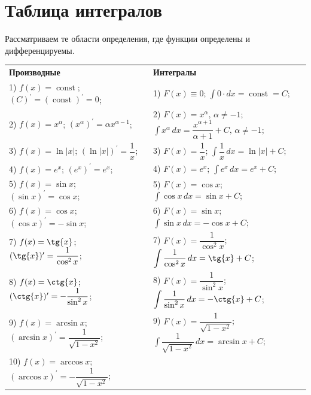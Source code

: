 \documentclass[12pt]{article}
\theoremstyle{definition}
\DeclareMathOperator{\const}{\text{const}}
\DeclareMathOperator{\dint}{\displaystyle\int}
\begin{document}
\newpage
\section*{Таблица интегралов}
Рассматриваем те области определения, где функции определены и дифференцируемы. 

\begin{tabular}{|p{}|p{}|}	
	\hline
	\rule{0pt}{3ex}\textbf{Производные} &\textbf{Интегралы}\\[0.5ex] \hhline{|=|=|}
	\rule{0pt}{4.2ex}1) $f(x) = \const$; $(C)^\prime = (\const)^\prime = 0$;& 
	\rule{0pt}{4.2ex}1) $F(x) \equiv 0$; $\dint 0{\cdot}dx = \const = C$;
	\\[2.4ex]\hline
	\rule{0pt}{4.2ex}2) $f(x) = x^\alpha$; $(x^\alpha)^\prime = \alpha x^{\alpha - 1}$; & 
	\rule{0pt}{4.2ex}2) $F(x) = x^\alpha, \, \alpha \neq -1$;  $\dint x^\alpha \, dx = \dfrac{x^{\alpha + 1}}{\alpha + 1}  + C, \, \alpha \neq -1$;
	\\[2ex]\hline
	\rule{0pt}{4.2ex}3) $f(x) = \ln{|x|}$; $(\ln{|x|})^\prime = \dfrac{1}{x}$;& 
	\rule{0pt}{4.2ex}3) $F(x) = \dfrac{1}{x}$; $\dint \dfrac{1}{x} \, dx = \ln{|x|} + C$;
	\\[2ex]\hline
	\rule{0pt}{4.2ex}4) $f(x) = e^x$; $(e^x)^\prime = e^x$; & 
	\rule{0pt}{4.2ex}4) $F(x) = e^x$; $\dint e^x \, dx = e^x + C$;
	\\[2ex]\hline
	\rule{0pt}{4.2ex}5) $f(x) = \sin{x}$;  $(\sin{x})^\prime = \cos{x}$; & 
	\rule{0pt}{4.2ex}5) $F(x) = \cos{x}$; $\dint \cos{x} \, dx = \sin{x} + C$;
	\\[2ex]\hline
	\rule{0pt}{4.2ex}6) $f(x) = \cos{x}$;  $(\cos{x})^\prime = - \sin{x}$; & 
	\rule{0pt}{4.2ex}6) $F(x) = \sin{x}$; $\dint \sin{x} \, dx = -\cos{x} + C$;
	\\[2ex]\hline
	\rule{0pt}{4.2ex}7) $f(x) = \tg{x}$; $(\tg{x})^\prime = \dfrac{1}{\cos^2{x}}$; & 
	\rule{0pt}{4.2ex}7) $F(x) = \dfrac{1}{\cos^2{x}}$; $\dint \dfrac{1}{\cos^2{x}} \, dx = \tg{x} + C$;
	\\[2ex]\hline
	\rule{0pt}{4.2ex}8) $f(x) = \ctg{x}$; $(\ctg{x})^\prime = -\dfrac{1}{\sin^2{x}}$; & 
	\rule{0pt}{4.2ex}8) $F(x) = \dfrac{1}{\sin^2{x}}$; $\dint \dfrac{1}{\sin^2{x}} \, dx = - \ctg{x} + C$;
	\\[2ex]\hline
	\rule{0pt}{4.2ex}9) $f(x) = \arcsin{x}$; $(\arcsin{x})^\prime = \dfrac{1}{\sqrt{1-x^2}}$; & 
	\rule{0pt}{4.2ex}9) $F(x) = \dfrac{1}{\sqrt{1-x^2}}$; $\dint \dfrac{1}{\sqrt{1-x^2}} \, dx = \arcsin{x} + C$;
	\\[2ex]\hline
	\rule{0pt}{4.2ex}10) $f(x) = \arccos{x}$; $(\arccos{x})^\prime = -\dfrac{1}{\sqrt{1-x^2}}$; & 

\end{tabular}
\end{document}
